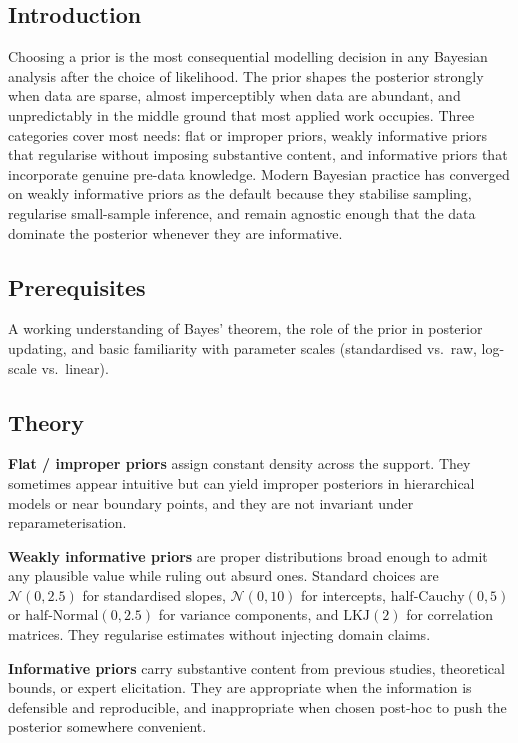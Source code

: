 \documentclass[
]{article}
\author{}
\date{\vspace{-2.5em}}
\begin{document}
\subsection{Introduction}\label{introduction}

Choosing a prior is the most consequential modelling decision in any
Bayesian analysis after the choice of likelihood. The prior shapes the
posterior strongly when data are sparse, almost imperceptibly when data
are abundant, and unpredictably in the middle ground that most applied
work occupies. Three categories cover most needs: flat or improper
priors, weakly informative priors that regularise without imposing
substantive content, and informative priors that incorporate genuine
pre-data knowledge. Modern Bayesian practice has converged on weakly
informative priors as the default because they stabilise sampling,
regularise small-sample inference, and remain agnostic enough that the
data dominate the posterior whenever they are informative.

\subsection{Prerequisites}\label{prerequisites}

A working understanding of Bayes' theorem, the role of the prior in
posterior updating, and basic familiarity with parameter scales
(standardised vs.~raw, log-scale vs.~linear).

\subsection{Theory}\label{theory}

\textbf{Flat / improper priors} assign constant density across the
support. They sometimes appear intuitive but can yield improper
posteriors in hierarchical models or near boundary points, and they are
not invariant under reparameterisation.

\textbf{Weakly informative priors} are proper distributions broad enough
to admit any plausible value while ruling out absurd ones. Standard
choices are \(\mathcal N(0, 2.5)\) for standardised slopes,
\(\mathcal N(0, 10)\) for intercepts,
\(\mathrm{half\text{-}Cauchy}(0, 5)\) or
\(\mathrm{half\text{-}Normal}(0, 2.5)\) for variance components, and
\(\mathrm{LKJ}(2)\) for correlation matrices. They regularise estimates
without injecting domain claims.

\textbf{Informative priors} carry substantive content from previous
studies, theoretical bounds, or expert elicitation. They are appropriate
when the information is defensible and reproducible, and inappropriate
when chosen post-hoc to push the posterior somewhere convenient.
\end{document}
